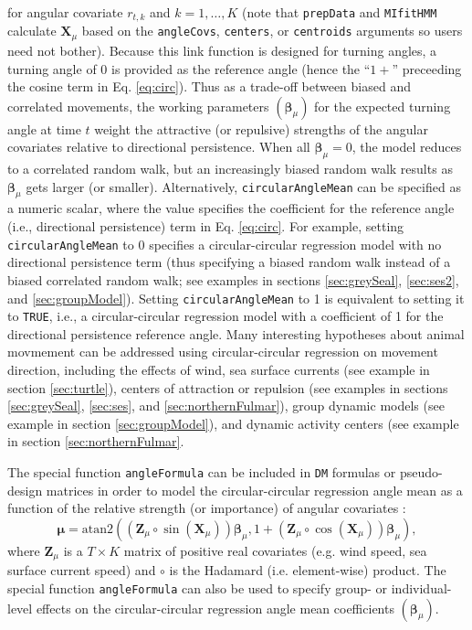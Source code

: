 \documentclass[12pt]{article}\usepackage[]{graphicx}\usepackage[]{color}
\begin{document}
for angular covariate $r_{t,k}$ and $k=1,\ldots,K$ (note that \verb|prepData| and \verb|MIfitHMM| calculate ${\mathbf X}_\mu$ based on the \verb|angleCovs|, \verb|centers|, or \verb|centroids| arguments so users need not bother). Because this link function is designed for turning angles, a turning angle of 0 is provided as the reference angle (hence the ``$1+$'' preceeding the cosine term in Eq. \ref{eq:circ}).  Thus as a trade-off between biased and correlated movements, the working parameters $({\boldsymbol \beta}_\mu)$ for the expected turning angle at time $t$ weight the attractive (or repulsive) strengths of the angular covariates relative to directional persistence.  When all ${\boldsymbol \beta}_\mu=0$, the model reduces to a correlated random walk, but an increasingly biased random walk results as ${\boldsymbol \beta}_\mu$ gets larger (or smaller). Alternatively, \verb|circularAngleMean| can be specified as a numeric scalar, where the value specifies the coefficient for the reference angle (i.e., directional persistence) term in Eq. \ref{eq:circ}. For example, setting \verb|circularAngleMean| to 0 specifies a circular-circular regression model with no directional persistence term (thus specifying a biased random walk instead of a biased correlated random walk; see examples in sections \ref{sec:greySeal}, \ref{sec:ses2}, and \ref{sec:groupModel}). Setting \verb|circularAngleMean| to 1 is equivalent to setting it to \verb|TRUE|, i.e., a circular-circular regression model with a coefficient of 1 for the directional persistence reference angle. Many interesting hypotheses about animal movmement can be addressed using circular-circular regression on movement direction, including the effects of wind, sea surface currents (see example in section \ref{sec:turtle}), centers of attraction or repulsion (see examples in sections \ref{sec:greySeal}, \ref{sec:ses}, and \ref{sec:northernFulmar}), group dynamic models (see example in section \ref{sec:groupModel}), and dynamic activity centers (see example in section \ref{sec:northernFulmar}.

The special function \verb|angleFormula| can be included in \verb|DM| formulas or pseudo-design matrices in order to model the circular-circular regression angle mean as a function of the relative strength (or importance) of angular covariates \citep{RivestEtAl2016}:
\begin{equation}
  {\boldsymbol \mu}=\text{atan2}(({\mathbf Z}_\mu \circ \sin({\mathbf X}_\mu)){\boldsymbol \beta}_\mu,1+({\mathbf Z}_\mu \circ \cos({\mathbf X}_\mu)){\boldsymbol \beta}_\mu),
  \label{eq:circ2}
\end{equation}
where ${\mathbf Z}_\mu$ is a $T \times K$ matrix of positive real covariates (e.g. wind speed, sea surface current speed) and $\circ$ is the Hadamard (i.e. element-wise) product.  The special function \verb|angleFormula| can also be used to specify group- or individual-level effects on the circular-circular regression angle mean coefficients $({\boldsymbol \beta}_\mu)$.
\end{document}
